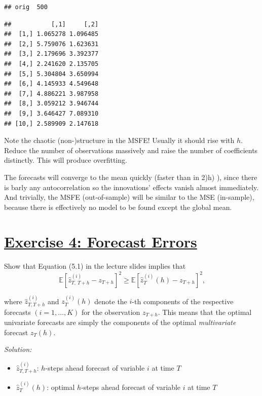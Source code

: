 \documentclass[12pt,a4paper]{article}
\newcommand{\tmpsection}[1]{}
\let\tmpsection=\section
\renewcommand{\section}[1]{\tmpsection{\underline{#1}} }
\newenvironment{Shaded}{\begin{snugshade}}{\end{snugshade}}
\newcommand{\NormalTok}[1]{#1}
\newcommand{\OperatorTok}[1]{\textcolor[rgb]{0.81,0.36,0.00}{\textbf{#1}}}
\newcommand{\StringTok}[1]{\textcolor[rgb]{0.31,0.60,0.02}{#1}}
\begin{document}
\begin{verbatim}
## orig  500
\end{verbatim}

\begin{Shaded}
\end{Shaded}

\begin{verbatim}
##           [,1]     [,2]
##  [1,] 1.065278 1.096485
##  [2,] 5.759076 1.623631
##  [3,] 2.179696 3.392377
##  [4,] 2.241620 2.135705
##  [5,] 5.304804 3.650994
##  [6,] 4.145933 4.549648
##  [7,] 4.886221 3.987958
##  [8,] 3.059212 3.946744
##  [9,] 3.646427 7.089310
## [10,] 2.589909 2.147618
\end{verbatim}

Note the chaotic (non-)structure in the MSFE! Usually it should rise
with \(h\). Reduce the number of observations massively and raise the
number of coefficients distinctly. This will produce overfitting.

The forecasts will converge to the mean quickly (faster than in 2)h) ),
since there is barly any autocorrelation so the innovations' effects
vanish almost immediately. And trivially, the MSFE (out-of-sample) will
be similar to the MSE (in-sample), because there is effectively no model
to be found except the global mean.

\hypertarget{exercise-4-forecast-errors}{%
\section{Exercise 4: Forecast Errors}\label{exercise-4-forecast-errors}}

Show that Equation (5.1) in the lecture slides implies that
\[ \mathbb{E} \left[ \hat{z}_{T,\ T + h}^{(i)} - z_{T+h} \right]^2 \geq \mathbb{E} \left[ \hat{z}_{T}^{(i)}  (h)- z_{T+h} \right]^2 \text{,}\]

where \(\hat{z}_{T, T+h}^{(i)}\) and \(z_T^{(i)} (h)\) denote the
\(i\)-th components of the respective forecasts \((i = 1, \dots ,K)\)
for the observation \(z_{T+h}\). This means that the optimal univariate
forecasts are simply the components of the optimal \emph{multivariate}
forecast \(z_T (h)\).

\emph{Solution:}

\begin{itemize}
  \item $\hat{z}_{T, T+h}^{(i)}$: $h$-steps ahead forecast of variable $i$ at time $T$ 
  \item $\hat{z}_{T}^{(i)} (h)$: optimal $h$-steps ahead forecast of variable $i$ at time $T$
\end{itemize}
\end{document}
